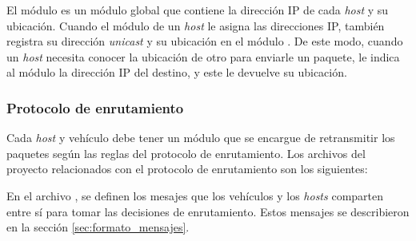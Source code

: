 
\begin{sloppypar}
El módulo  es un módulo global que contiene la
dirección IP de cada \textit{host} y su ubicación. Cuando el módulo
 de un \textit{host} le asigna las direcciones IP,
también registra su dirección \textit{unicast} y su ubicación en el módulo
. De este modo, cuando un \textit{host} necesita
conocer la ubicación de otro para enviarle un paquete, le indica al módulo
 la dirección IP del destino, y este le devuelve su
ubicación.
\end{sloppypar}


\subsubsection{Protocolo de enrutamiento}

\label{subsubsec:protocolo_de_enrutamiento_sim}

Cada \textit{host} y vehículo debe tener un módulo que se encargue de
retransmitir los paquetes según las reglas del protocolo de enrutamiento. Los
archivos del proyecto relacionados con el protocolo de enrutamiento son los
siguientes:


En el archivo , se definen los mesajes que los vehículos y
los \textit{hosts} comparten entre sí para tomar las decisiones de
enrutamiento. Estos mensajes se describieron en la sección
\ref{sec:formato_mensajes}.


